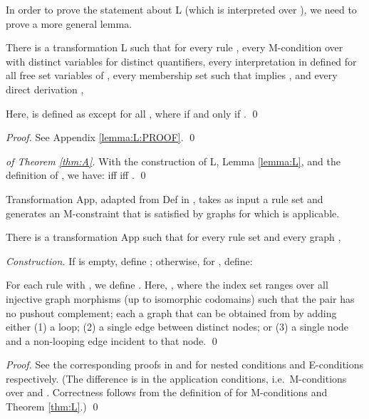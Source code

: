 \documentclass{llncs}
\begin{document}
In order to prove the statement about L (which is interpreted over ), we need to prove a more general lemma.

\begin{lemma}\label{lemma:L}\rm
	There is a transformation L such that for every rule , every M-condition  over  with distinct variables for distinct quantifiers, every interpretation  in  defined for all free set variables of , every membership set  such that  implies , and every direct derivation ,
	
	
	\noindent Here,  is defined as  except for all , where  if and only if .
	\qed
\end{lemma}

\begin{proof}
	See Appendix \ref{lemma:L:PROOF}.
	\qed
\end{proof}

\begin{proof}[of Theorem \ref{thm:A}]\rm
	With the construction of L, Lemma \ref{lemma:L}, and the definition of , we have:  iff  iff .
	\qed
\end{proof}

Transformation App, adapted from Def in \cite{Pennemann09a}, takes as input a rule set  and generates an M-constraint that is satisfied by graphs for which  is applicable.

\begin{theorem}\label{thm:A}\rm
	There is a transformation App such that for every rule set  and every graph ,
	

\noindent \emph{Construction.} If  is empty, define ; otherwise, for , define:
	
	
	\noindent For each rule  with , we define . Here, , where the index set  ranges over all injective graph morphisms  (up to isomorphic codomains) such that the pair  has no pushout complement; each  a graph that can be obtained from  by adding either (1) a loop; (2) a single edge between distinct nodes; or (3) a single node and a non-looping edge incident to that node.
	\qed
\end{theorem}

\begin{proof}
	See the corresponding proofs in \cite{Pennemann09a} and \cite{Poskitt13a} for nested conditions and E-conditions respectively. (The difference is in the application conditions, i.e.\ M-conditions over  and . Correctness follows from the definition of  for M-conditions and Theorem \ref{thm:L}.)
	\qed
\end{proof}
\end{document}
